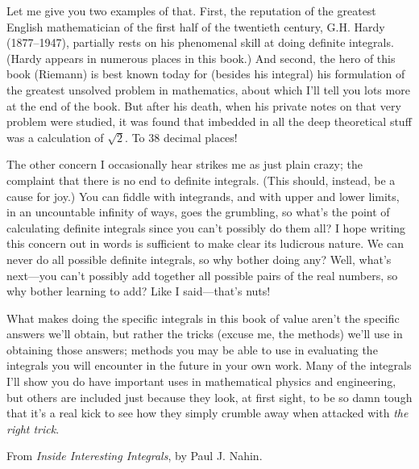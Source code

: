 Let me give you two examples of that. First, the reputation of the greatest
English mathematician of the first half of the twentieth century, G.H. Hardy
(1877–1947), partially rests on his phenomenal skill at doing definite integrals.
(Hardy appears in numerous places in this book.) And second, the hero of this book
(Riemann) is best known today for (besides his integral) his formulation of the
greatest unsolved problem in mathematics, about which I’ll tell you lots more at the
end of the book. But after his death, when his private notes on that very problem
were studied, it was found that imbedded in all the deep theoretical stuff was a
calculation of $ \sqrt{2} $. To 38 decimal places!

The other concern I occasionally hear strikes me as just plain crazy; the
complaint that there is no end to definite integrals. (This should, instead, be a
cause for joy.) You can fiddle with integrands, and with upper and lower limits, in
an uncountable infinity of ways, goes the grumbling, so what’s the point of
calculating definite integrals since you can’t possibly do them all? I hope writing
this concern out in words is sufficient to make clear its ludicrous nature. We can
never do all possible definite integrals, so why bother doing any? Well, what’s
next—you can’t possibly add together all possible pairs of the real numbers, so why
bother learning to add? Like I said—that’s nuts!

What makes doing the specific integrals in this book of value aren’t the specific
answers we’ll obtain, but rather the tricks (excuse me, the methods) we’ll use in
obtaining those answers; methods you may be able to use in evaluating the integrals
you will encounter in the future in your own work. Many of the integrals I’ll show
you do have important uses in mathematical physics and engineering, but others are
included just because they look, at first sight, to be so damn tough that it’s a real
kick to see how they simply crumble away when attacked with \textit{the right trick}.

\begin{flushright}
  From \textit{Inside Interesting Integrals}, by Paul J. Nahin.
\end{flushright}

